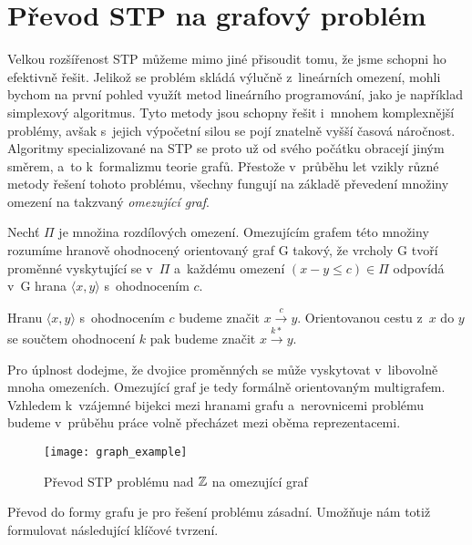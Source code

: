 \section{Převod STP na grafový problém}\label{graf}

Velkou rozšířenost STP můžeme mimo jiné přisoudit tomu, že jsme schopni ho efektivně řešit. Jelikož se problém skládá výlučně z~lineárních omezení, mohli bychom na první pohled využít metod lineárního programování, jako je například simplexový algoritmus. Tyto metody jsou schopny řešit i~mnohem komplexnější problémy, avšak s~jejich výpočetní silou se pojí znatelně vyšší časová náročnost. Algoritmy specializované na STP se proto už od svého počátku \cite[Kapitola 2]{Dechter91} obracejí jiným směrem, a~to k~formalizmu teorie grafů. Přestože v~průběhu let vzikly různé metody řešení tohoto problému, všechny fungují na základě převedení množiny omezení na takzvaný \emph{omezující graf}.

\begin{definice}
	Nechť $\Pi$ je množina rozdílových omezení. Omezujícím grafem této množiny rozumíme hranově ohodnocený orientovaný graf G takový, že vrcholy G tvoří proměnné vyskytující se v~$\Pi$ a~každému omezení $(x-y \leq c) \in \Pi$ odpovídá v~G hrana $\langle x,y\rangle$ s~ohodnocením $c$.
\end{definice}
\begin{pozn}
	Hranu $\langle x,y\rangle$ s~ohodnocením $c$ budeme značit $x \xrightarrow{c} y$. Orientovanou cestu z~$x$ do $y$ se součtem ohodnocení $k$ pak budeme značit $x \xrightarrow{k*} y$.
\end{pozn}

Pro úplnost dodejme, že dvojice proměnných se může vyskytovat v~libovolně mnoha omezeních. Omezující graf je tedy formálně orientovaným multigrafem. Vzhledem k~vzájemné bijekci mezi hranami grafu a~nerovnicemi problému budeme v~průběhu práce volně přecházet mezi oběma reprezentacemi.

\begin{figure}
	\centering
	\texttt{[image: graph\_example]}
	\caption{Převod STP problému nad $\mathbb{Z}$ na omezující graf}
\end{figure}

Převod do formy grafu je pro řešení problému zásadní. Umožňuje nám totiž formulovat následující klíčové tvrzení.

